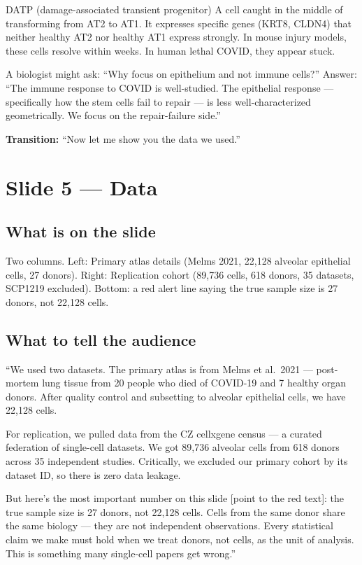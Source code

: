 \documentclass[11pt]{article}
\begin{document}
\begin{jargon}{DATP (damage-associated transient progenitor)}
A cell caught in the middle of transforming from AT2 to AT1. It expresses specific genes (KRT8, CLDN4) that neither healthy AT2 nor healthy AT1 express strongly. In mouse injury models, these cells resolve within weeks. In human lethal COVID, they appear stuck.
\end{jargon}

\begin{pitfall}
A biologist might ask: ``Why focus on epithelium and not immune cells?'' Answer: ``The immune response to COVID is well-studied. The epithelial response --- specifically how the stem cells fail to repair --- is less well-characterized geometrically. We focus on the repair-failure side.''
\end{pitfall}

\textbf{Transition:} ``Now let me show you the data we used.''


\section{Slide 5 --- Data}

\subsection{What is on the slide}

Two columns. Left: Primary atlas details (Melms 2021, 22,128 alveolar epithelial cells, 27 donors). Right: Replication cohort (89,736 cells, 618 donors, 35 datasets, SCP1219 excluded). Bottom: a red alert line saying the true sample size is 27 donors, not 22,128 cells.

\subsection{What to tell the audience}

\begin{speaknote}
``We used two datasets. The primary atlas is from Melms et al.\ 2021 --- post-mortem lung tissue from 20 people who died of COVID-19 and 7 healthy organ donors. After quality control and subsetting to alveolar epithelial cells, we have 22,128 cells.

For replication, we pulled data from the CZ cellxgene census --- a curated federation of single-cell datasets. We got 89,736 alveolar cells from 618 donors across 35 independent studies. Critically, we excluded our primary cohort by its dataset ID, so there is zero data leakage.

But here's the most important number on this slide [point to the red text]: the true sample size is 27 donors, not 22,128 cells. Cells from the same donor share the same biology --- they are not independent observations. Every statistical claim we make must hold when we treat donors, not cells, as the unit of analysis. This is something many single-cell papers get wrong.''
\end{speaknote}
\end{document}
